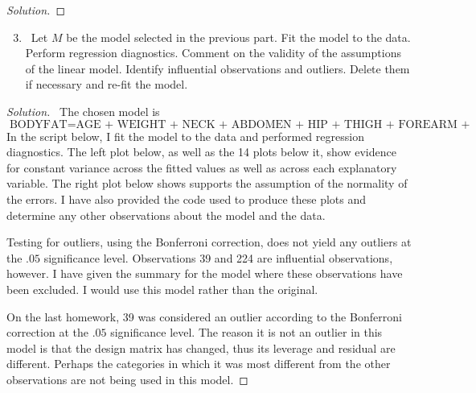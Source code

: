 \documentclass[12pt]{article}
\begin{document}
\begin{enumerate}[leftmargin=0cm,itemindent=.5cm,labelwidth=\itemindent,labelsep=0cm,align=left]
\begin{proof}[Solution]

\end{proof}



\begin{enumerate}
\setcounter{enumii}{2}
\item \ Let $M$ be the model selected in the previous part.  Fit the model to the data.  Perform regression diagnostics.  Comment on the validity of the assumptions of the linear model.  Identify influential observations and outliers.  Delete them if necessary and re-fit the model.
\end{enumerate}



\begin{proof}[Solution]
\ The chosen model is
$$
\text{BODYFAT} = \text{AGE + WEIGHT + NECK + ABDOMEN + HIP + THIGH + FOREARM + WRIST.}
$$
In the script below, I fit the model to the data and performed regression diagnostics.  The left plot below, as well as the 14 plots below it, show evidence for constant variance across the fitted values as well as across each explanatory variable.  The right plot below shows supports the assumption of the normality of the errors.  I have also provided the code used to produce these plots and determine any other observations about the model and the data.

Testing for outliers, using the Bonferroni correction, does not yield any outliers at the $.05$ significance level.  Observations 39 and 224 are influential observations, however.  I have given the summary for the model where these observations have been excluded.  I would use this model rather than the original.

On the last homework, 39 was considered an outlier according to the Bonferroni correction at the $.05$ significance level.  The reason it is not an outlier in this model is that the design matrix has changed, thus its leverage and residual are different.  Perhaps the categories in which it was most different from the other observations are not being used in this model.


\end{proof}
\end{enumerate}
\end{document}
